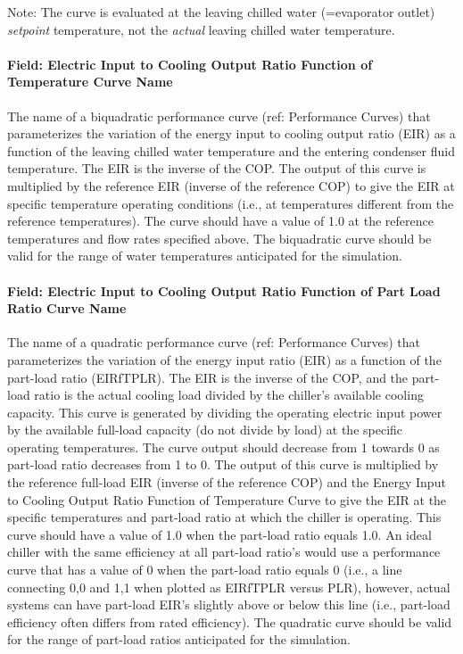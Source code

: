 Note: The curve is evaluated at the leaving chilled water (=evaporator outlet) \emph{setpoint} temperature, not the \emph{actual} leaving chilled water temperature.

\paragraph{Field: Electric Input to Cooling Output Ratio Function of Temperature Curve Name}\label{field-electric-input-to-cooling-output-ratio-function-of-temperature-curve-name}

The name of a biquadratic performance curve (ref: Performance Curves) that parameterizes the variation of the energy input to cooling output ratio (EIR) as a function of the leaving chilled water temperature and the entering condenser fluid temperature. The EIR is the inverse of the COP. The output of this curve is multiplied by the reference EIR (inverse of the reference COP) to give the EIR at specific temperature operating conditions (i.e., at temperatures different from the reference temperatures). The curve should have a value of 1.0 at the reference temperatures and flow rates specified above. The biquadratic curve should be valid for the range of water temperatures anticipated for the simulation.

\paragraph{Field: Electric Input to Cooling Output Ratio Function of Part Load Ratio Curve Name}\label{field-electric-input-to-cooling-output-ratio-function-of-part-load-ratio-curve-name}

The name of a quadratic performance curve (ref: Performance Curves) that parameterizes the variation of the energy input ratio (EIR) as a function of the part-load ratio (EIRfTPLR). The EIR is the inverse of the COP, and the part-load ratio is the actual cooling load divided by the chiller's available cooling capacity. This curve is generated by dividing the operating electric input power by the available full-load capacity (do not divide by load) at the specific operating temperatures. The curve output should decrease from 1 towards 0 as part-load ratio decreases from 1 to 0. The output of this curve is multiplied by the reference full-load EIR (inverse of the reference COP) and the Energy Input to Cooling Output Ratio Function of Temperature Curve to give the EIR at the specific temperatures and part-load ratio at which the chiller is operating. This curve should have a value of 1.0 when the part-load ratio equals 1.0. An ideal chiller with the same efficiency at all part-load ratio's would use a performance curve that has a value of 0 when the part-load ratio equals 0 (i.e., a line connecting 0,0 and 1,1 when plotted as EIRfTPLR versus PLR), however, actual systems can have part-load EIR's slightly above or below this line (i.e., part-load efficiency often differs from rated efficiency). The quadratic curve should be valid for the range of part-load ratios anticipated for the simulation.

